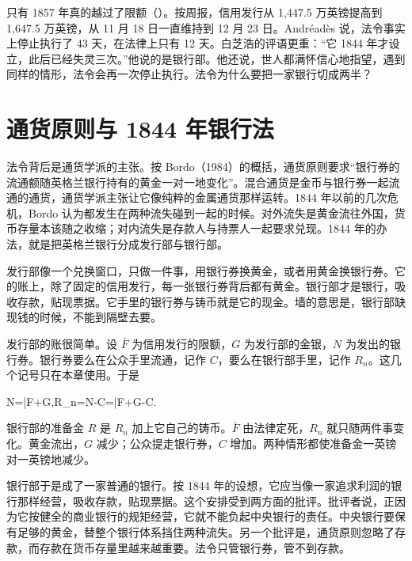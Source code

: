 只有 1857 年真的越过了限额（）。按周报，信用发行从 1,447.5 万英镑提高到 1,647.5 万英镑，从 11 月 18 日一直维持到 12 月 23 日\cite{boe2017}。Andréadès 说，法令事实上停止执行了 43 天，在法律上只有 12 天\cite{andreades1909}。白芝浩的评语更重：“它 1844 年才设立，此后已经失灵三次。”\cite{bagehot1873}他说的是银行部。他还说，世人都满怀信心地指望，遇到同样的情形，法令会再一次停止执行\cite{bagehot1873}。法令为什么要把一家银行切成两半？

\section{通货原则与 1844 年银行法}\label{sec:gold-1844}

法令背后是通货学派的主张。按 Bordo（1984）的概括，通货原则要求“银行券的流通额随英格兰银行持有的黄金一对一地变化”\cite{bordo1984}。混合通货是金币与银行券一起流通的通货，通货学派主张让它像纯粹的金属通货那样运转\cite{bordo1984}。1844 年以前的几次危机，Bordo 认为都发生在两种流失碰到一起的时候\cite{bordo1984}。对外流失是黄金流往外国，货币存量本该随之收缩；对内流失是存款人与持票人一起要求兑现。1844 年的办法，就是把英格兰银行分成发行部与银行部\cite{bordo1984}。

\begin{intuition}
发行部像一个兑换窗口，只做一件事，用银行券换黄金，或者用黄金换银行券。它的账上，除了固定的信用发行，每一张银行券背后都有黄金。银行部才是银行，吸收存款，贴现票据。它手里的银行券与铸币就是它的现金。墙的意思是，银行部缺现钱的时候，不能到隔壁去要。
\end{intuition}

发行部的账很简单。设 $\bar F$ 为信用发行的限额，$G$ 为发行部的金银，$N$ 为发出的银行券。银行券要么在公众手里流通，记作 $C$，要么在银行部手里，记作 $R_n$。这几个记号只在本章使用。于是
\begin{keyeq}
N=\bar F+G,\qquad R_n=N-C=\bar F+G-C.\label{eq:gold-issue}
\end{keyeq}
银行部的准备金 $R$ 是 $R_n$ 加上它自己的铸币。$\bar F$ 由法律定死，$R_n$ 就只随两件事变化。黄金流出，$G$ 减少；公众提走银行券，$C$ 增加。两种情形都使准备金一英镑对一英镑地减少。

银行部于是成了一家普通的银行。按 1844 年的设想，它应当像一家追求利润的银行那样经营，吸收存款，贴现票据\cite{bordo1984}。这个安排受到两方面的批评。批评者说，正因为它按健全的商业银行的规矩经营，它就不能负起中央银行的责任\cite{bordo1984}。中央银行要保有足够的黄金，替整个银行体系挡住两种流失。另一个批评是，通货原则忽略了存款，而存款在货币存量里越来越重要\cite{bordo1984}。法令只管银行券，管不到存款。

